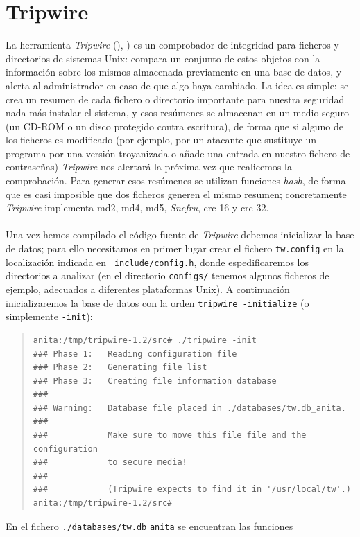 \section{Tripwire}
La herramienta {\it Tripwire} (\cite{kn:kim93}), 
\cite{kn:kim94b}) es un comprobador de integridad para ficheros y
directorios de sistemas Unix: compara un conjunto de estos objetos con la
informaci\'on sobre los mismos almacenada previamente en una base de datos, y
alerta al administrador en caso de que algo haya cambiado. La idea es simple:
se crea un resumen de cada fichero o directorio importante para nuestra 
seguridad nada m\'as instalar el sistema, y esos res\'umenes se almacenan en
un medio seguro (un CD-ROM o un disco protegido contra escritura), de forma que 
si alguno de los ficheros es modificado (por ejemplo, por un atacante que 
sustituye un programa por una versi\'on troyanizada o a\~nade una entrada en
nuestro fichero de contrase\~nas) {\it Tripwire} nos alertar\'a la pr\'oxima
vez que realicemos la comprobaci\'on. Para generar esos res\'umenes se utilizan
funciones {\it hash}, de forma que es casi imposible que dos ficheros generen
el mismo resumen; concretamente {\it Tripwire} implementa {\sc md2}, {\sc md4}, 
{\sc md5}, {\it Snefru}, {\sc crc-16} y {\sc crc-32}.\\
\\Una vez hemos compilado el c\'odigo fuente de {\it Tripwire} debemos 
inicializar la base de datos; para ello necesitamos en primer lugar crear el 
fichero {\tt tw.config} en la localizaci\'on indicada en {\tt 
include/config.h}, donde 
espedificaremos los directorios a analizar (en el directorio {\tt configs/} 
tenemos algunos ficheros de ejemplo, adecuados a diferentes plataformas Unix).
A continuaci\'on inicializaremos la base de datos con la orden {\tt tripwire 
-initialize} (o simplemente {\tt -init}):
\begin{quote}
\begin{verbatim}
anita:/tmp/tripwire-1.2/src# ./tripwire -init
### Phase 1:   Reading configuration file
### Phase 2:   Generating file list
### Phase 3:   Creating file information database
###
### Warning:   Database file placed in ./databases/tw.db_anita.
###
###            Make sure to move this file file and the configuration
###            to secure media!
###
###            (Tripwire expects to find it in '/usr/local/tw'.)
anita:/tmp/tripwire-1.2/src# 
\end{verbatim}
\end{quote}
En el fichero {\tt ./databases/tw.db$\_$anita} se encuentran las funciones
